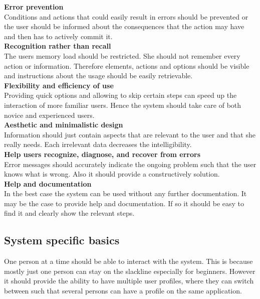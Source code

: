\textbf{Error prevention}\\
Conditions and actions that could easily result in errors should be prevented or the user should be informed about the consequences that the action may have and then has to actively commit it.\\

\textbf{Recognition rather than recall}\\
The users memory load should be restricted. She should not remember every action or information. Therefore elements, actions and options should be visible and instructions about the usage should be easily retrievable.\\

\textbf{Flexibility and efficiency of use}\\
Providing quick options and allowing to skip certain steps can speed up the interaction of more familiar users. Hence the system should take care of both novice and experienced users.\\

\textbf{Aesthetic and minimalistic design}\\
Information should just contain aspects that are relevant to the user and that she really needs. Each irrelevant data decreases the intelligibility.\\

\textbf{Help users recognize, diagnose, and recover from errors}\\
Error messages should accurately indicate the ongoing problem such that the user knows what is wrong. Also it should provide a constructively solution.\\

\textbf{Help and documentation}\\
In the best case the system can be used without any further documentation. It may be the case to provide help and documentation. If so it should be easy to find it and clearly show the relevant steps.\\

\subsection{System specific basics}\label{systemBasics}
One person at a time should be able to interact with the system. This is because mostly just one person can stay on the slackline especially for beginners. However it should provide the ability to have multiple user profiles, where they can switch between such that several persons can have a profile on the same application.\\

